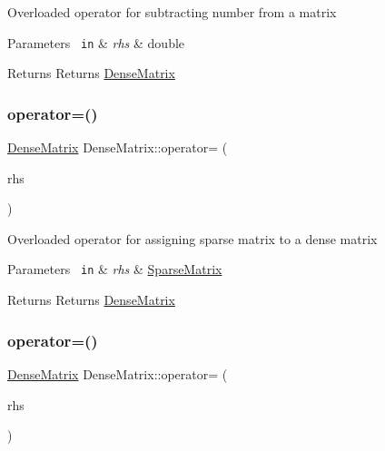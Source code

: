 Overloaded operator for subtracting number from a matrix 
\begin{DoxyParams}[1]{Parameters}
\mbox{\texttt{ in}}  & {\em rhs} & double \\
\hline
\end{DoxyParams}
\begin{DoxyReturn}{Returns}
Returns \mbox{\hyperlink{class_dense_matrix}{Dense\+Matrix}} 
\end{DoxyReturn}
\mbox{\label{class_dense_matrix_aeb227b489f8f0922dace88ad2e0a3ccf}} 
\subsubsection{\texorpdfstring{operator=()}{operator=()}\hspace{0.1cm}{\footnotesize\ttfamily [1/2]}}
{\footnotesize\ttfamily \mbox{\hyperlink{class_dense_matrix}{Dense\+Matrix}} Dense\+Matrix\+::operator= (\begin{DoxyParamCaption}\item[{const \mbox{\hyperlink{class_sparse_matrix}{Sparse\+Matrix}} \&}]{rhs }\end{DoxyParamCaption})}

Overloaded operator for assigning sparse matrix to a dense matrix 
\begin{DoxyParams}[1]{Parameters}
\mbox{\texttt{ in}}  & {\em rhs} & \mbox{\hyperlink{class_sparse_matrix}{Sparse\+Matrix}} \\
\hline
\end{DoxyParams}
\begin{DoxyReturn}{Returns}
Returns \mbox{\hyperlink{class_dense_matrix}{Dense\+Matrix}} 
\end{DoxyReturn}
\mbox{\label{class_dense_matrix_a896beaab3cb4457f7059a69ea7abc616}} 
\subsubsection{\texorpdfstring{operator=()}{operator=()}\hspace{0.1cm}{\footnotesize\ttfamily [2/2]}}
{\footnotesize\ttfamily \mbox{\hyperlink{class_dense_matrix}{Dense\+Matrix}} Dense\+Matrix\+::operator= (\begin{DoxyParamCaption}\item[{const \mbox{\hyperlink{class_dense_matrix}{Dense\+Matrix}} \&}]{rhs }\end{DoxyParamCaption})}

